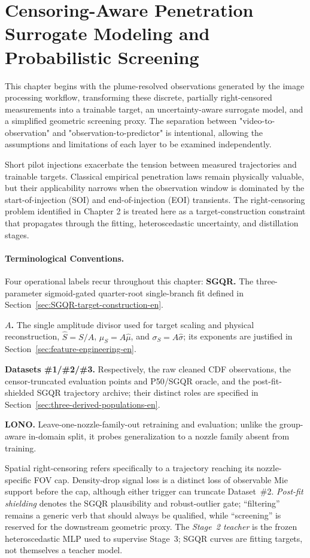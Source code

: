 \section{Censoring-Aware Penetration Surrogate Modeling and Probabilistic Screening}

This chapter begins with the plume-resolved observations generated by the image processing workflow, transforming these discrete, partially right-censored measurements into a trainable target, an uncertainty-aware surrogate model, and a simplified geometric screening proxy. The separation between "video-to-observation" and "observation-to-predictor" is intentional, allowing the assumptions and limitations of each layer to be examined independently.

Short pilot injections exacerbate the tension between measured trajectories and trainable targets. Classical empirical penetration laws remain physically valuable, but their applicability narrows when the observation window is dominated by the start-of-injection (SOI) and end-of-injection (EOI) transients. The right-censoring problem identified in Chapter 2 is treated here as a target-construction constraint that propagates through the fitting, heteroscedastic uncertainty, and distillation stages.

\paragraph{Terminological Conventions.}
Four operational labels recur throughout this chapter:
\noindent\textbf{SGQR.} The three-parameter sigmoid-gated quarter-root single-branch fit defined in Section~\ref{sec:SGQR-target-construction-en}.\par
\noindent\textbf{$A$.} The single amplitude divisor used for target scaling and physical reconstruction, \(\hat S=S/A\), \(\mu_S=A\hat\mu\), and \(\sigma_S=A\hat\sigma\); its exponents are justified in Section~\ref{sec:feature-engineering-en}.\par
\noindent\textbf{Datasets \#1/\#2/\#3.} Respectively, the raw cleaned CDF observations, the censor-truncated evaluation points and P50/SGQR oracle, and the post-fit-shielded SGQR trajectory archive; their distinct roles are specified in Section~\ref{sec:three-derived-populations-en}.\par
\noindent\textbf{LONO.} Leave-one-nozzle-family-out retraining and evaluation; unlike the group-aware in-domain split, it probes generalization to a nozzle family absent from training.\par
Spatial right-censoring refers specifically to a trajectory reaching its nozzle-specific FOV cap. Density-drop signal loss is a distinct loss of observable Mie support before the cap, although either trigger can truncate Dataset~\#2. \emph{Post-fit shielding} denotes the SGQR plausibility and robust-outlier gate; ``filtering'' remains a generic verb that should always be qualified, while ``screening'' is reserved for the downstream geometric proxy. The \emph{Stage~2 teacher} is the frozen heteroscedastic MLP used to supervise Stage~3; SGQR curves are fitting targets, not themselves a teacher model.

